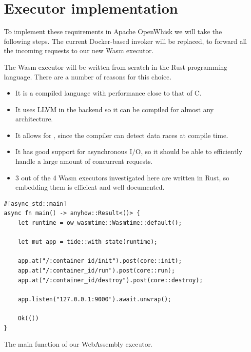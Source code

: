 \section{Executor implementation}


To implement these requirements in Apache OpenWhisk we will take the following steps. The current Docker-based invoker will be replaced, to forward all the incoming requests to our new Wasm executor. 

The Wasm executor will be written from scratch in the Rust programming language. There are a number of reasons for this choice.

\begin{itemize}
  \item It is a compiled language with performance close to that of C.
  \item It uses LLVM in the backend so it can be compiled for almost any architecture.
  \item It allows for , since the compiler can detect data races at compile time.
  \item It has good support for asynchronous I/O, so it should be able to efficiently handle a large amount of concurrent requests.
  \item 3 out of the 4 Wasm executors investigated here are written in Rust, so embedding them is efficient and well documented.
\end{itemize}

\begin{listing}[ht]
\begin{verbatim}
#[async_std::main]
async fn main() -> anyhow::Result<()> {
    let runtime = ow_wasmtime::Wasmtime::default();

    let mut app = tide::with_state(runtime);

    app.at("/:container_id/init").post(core::init);
    app.at("/:container_id/run").post(core::run);
    app.at("/:container_id/destroy").post(core::destroy);

    app.listen("127.0.0.1:9000").await.unwrap();

    Ok(())
}
\end{verbatim}
\caption{The main function of our WebAssembly executor.}
\label{listing:wasm-executor-main}
\end{listing}

